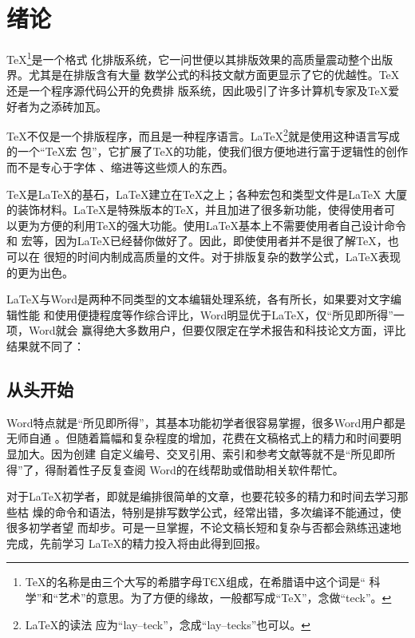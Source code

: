 \chapter{绪论}
\label{cha:overview}

\TeX{}\footnote{\TeX{}的名称是由三个大写的希腊字母ΤЄΧ组成，在希腊语中这个词是“
科学”和“艺术”的意思。为了方便的缘故，一般都写成“TeX”，念做“teck”。}是一个格式
化排版系统，它一问世便以其排版效果的高质量震动整个出版界。尤其是在排版含有大量
数学公式的科技文献方面更显示了它的优越性。\TeX{}还是一个程序源代码公开的免费排
版系统，因此吸引了许多计算机专家及\TeX{}爱好者为之添砖加瓦。

\TeX{}不仅是一个排版程序，而且是一种程序语言。\LaTeX{}\footnote{\LaTeX{}的读法
应为“lay--teck”，念成“lay--tecks”也可以。}就是使用这种语言写成的一个“\TeX{}宏
包”，它扩展了\TeX{}的功能，使我们很方便地进行富于逻辑性的创作而不是专心于字体
、缩进等这些烦人的东西。

\TeX{}是\LaTeX{}的基石，\LaTeX{}建立在\TeX{}之上；各种宏包和类型文件是\LaTeX{}
大厦的装饰材料。\LaTeX{}是特殊版本的\TeX{}，并且加进了很多新功能，使得使用者可
以更为方便的利用\TeX{}的强大功能。使用\LaTeX{}基本上不需要使用者自己设计命令和
宏等，因为\LaTeX{}已经替你做好了。因此，即使使用者并不是很了解\TeX{}，也可以在
很短的时间内制成高质量的文件。对于排版复杂的数学公式，\LaTeX{}表现的更为出色。

\LaTeX{}与Word是两种不同类型的文本编辑处理系统，各有所长，如果要对文字编辑性能
和使用便捷程度等作综合评比，Word明显优于\LaTeX{}，仅“所见即所得”一项，Word就会
赢得绝大多数用户，但要仅限定在学术报告和科技论文方面，评比结果就不同了：

\section*{从头开始}

Word特点就是“所见即所得”，其基本功能初学者很容易掌握，很多Word用户都是无师自通
。但随着篇幅和复杂程度的增加，花费在文稿格式上的精力和时间要明显加大。因为创建
自定义编号、交叉引用、索引和参考文献等就不是“所见即所得”了，得耐着性子反复查阅
Word的在线帮助或借助相关软件帮忙。

对于\LaTeX{}初学者，即就是编排很简单的文章，也要花较多的精力和时间去学习那些枯
燥的命令和语法，特别是排写数学公式，经常出错，多次编译不能通过，使很多初学者望
而却步。可是一旦掌握，不论文稿长短和复杂与否都会熟练迅速地完成，先前学习
\LaTeX{}的精力投入将由此得到回报。

